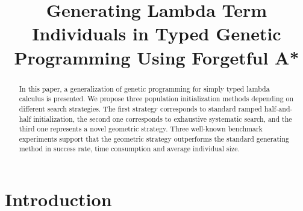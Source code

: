 \documentclass{llncs}
\begin{document}
\title{
Generating Lambda Term Individuals in Typed Genetic Programming Using Forgetful A*}
\maketitle

\begin{abstract}
In this paper, a generalization of genetic programming 
for simply typed lambda calculus is presented. We propose three population 
initialization methods depending on different search strategies. 
The first strategy corresponds to standard ramped half-and-half initialization, 
the second one corresponds to exhaustive systematic search, and the third one 
represents a novel geometric strategy. Three well-known benchmark experiments
support that the geometric strategy outperforms
the standard generating method in success rate, time consumption and average individual size. 
\end{abstract}


\section{Introduction}


\end{document}
